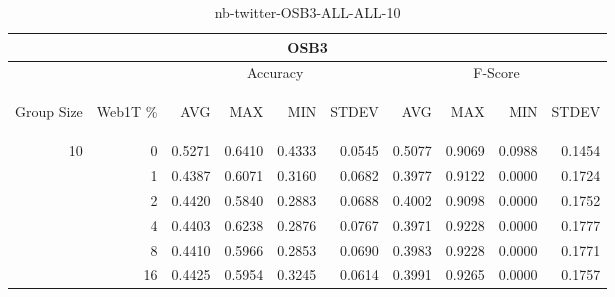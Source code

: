 \begin{center}
\begin{table}[htbp]
\begin{center}
\begin{tabular}{ | r | r | r | r | r | r | r | r | r | r |}
\hline
\multicolumn{10}{|c|}{OSB3}\\
\hline
 & & \multicolumn{4}{|c|}{Accuracy} & \multicolumn{4}{|c|}{F-Score}\\ \cline{3-10}
\begin{sideways}Group Size\end{sideways} & \begin{sideways}Web1T \%\end{sideways} & \begin{sideways}AVG\end{sideways} & \begin{sideways}MAX\end{sideways} & \begin{sideways}MIN\end{sideways} & \begin{sideways}STDEV\end{sideways} & \begin{sideways}AVG\end{sideways} & \begin{sideways}MAX\end{sideways} & \begin{sideways}MIN\end{sideways} & \begin{sideways}STDEV\end{sideways}\\
\hline
\multirow{5}{*}{10}
 & 0 & 0.5271 & 0.6410 & 0.4333 & 0.0545 & 0.5077 & 0.9069 & 0.0988 & 0.1454\\ \cline{2-10}
 & 1 & 0.4387 & 0.6071 & 0.3160 & 0.0682 & 0.3977 & 0.9122 & 0.0000 & 0.1724\\ \cline{2-10}
 & 2 & 0.4420 & 0.5840 & 0.2883 & 0.0688 & 0.4002 & 0.9098 & 0.0000 & 0.1752\\ \cline{2-10}
 & 4 & 0.4403 & 0.6238 & 0.2876 & 0.0767 & 0.3971 & 0.9228 & 0.0000 & 0.1777\\ \cline{2-10}
 & 8 & 0.4410 & 0.5966 & 0.2853 & 0.0690 & 0.3983 & 0.9228 & 0.0000 & 0.1771\\ \cline{2-10}
 & 16 & 0.4425 & 0.5954 & 0.3245 & 0.0614 & 0.3991 & 0.9265 & 0.0000 & 0.1757\\ \cline{2-10}
\hline
\end{tabular}
\caption{nb-twitter-OSB3-ALL-ALL-10}
\label{table:nb-twitter-OSB3-ALL-ALL-10}
\end{center}
\end{table}
\end{center}

